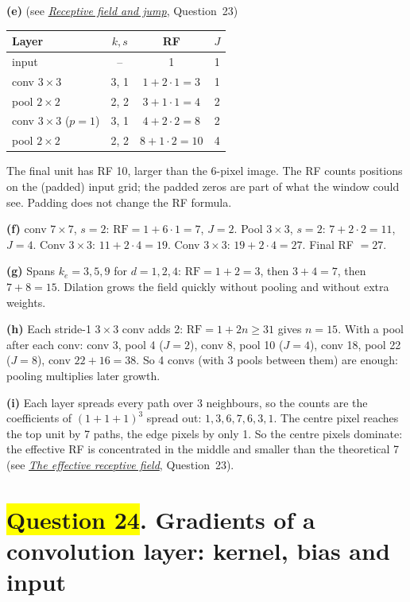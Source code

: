 \documentclass[12pt,a4paper]{article}
\newcommand{\seeconcept}[3]{(see \hyperref[#1]{\textit{#2}}, Question~#3)}
\newcommand{\hlq}[1]{{\setlength{\fboxsep}{1.5pt}\colorbox{yellow}{#1}}}
\begin{document}
\textbf{(e)} \seeconcept{c:rf}{Receptive field and jump}{23}
\begin{center}
\begin{tabular}{@{}lccc@{}}
\toprule
Layer & $k,s$ & RF & $J$\\
\midrule
input & -- & 1 & 1\\
conv $3\times3$ & 3, 1 & $1+2\cdot1=3$ & 1\\
pool $2\times2$ & 2, 2 & $3+1\cdot1=4$ & 2\\
conv $3\times3$ ($p=1$) & 3, 1 & $4+2\cdot2=8$ & 2\\
pool $2\times2$ & 2, 2 & $8+1\cdot2=10$ & 4\\
\bottomrule
\end{tabular}
\end{center}
The final unit has RF 10, larger than the 6-pixel image. The RF counts positions on the (padded) input grid; the padded zeros are part of what the window could see. Padding does not change the RF formula.

\textbf{(f)} conv $7\times7$, $s=2$: $\mathrm{RF}=1+6\cdot1=7$, $J=2$. Pool $3\times3$, $s=2$: $7+2\cdot2=11$, $J=4$. Conv $3\times3$: $11+2\cdot4=19$. Conv $3\times3$: $19+2\cdot4=27$. Final RF $=27$.

\textbf{(g)} Spans $k_e=3,5,9$ for $d=1,2,4$: $\mathrm{RF}=1+2=3$, then $3+4=7$, then $7+8=15$. Dilation grows the field quickly without pooling and without extra weights.

\textbf{(h)} Each stride-1 $3\times3$ conv adds 2: $\mathrm{RF}=1+2n\ge31$ gives $n=15$. With a pool after each conv: conv 3, pool 4 ($J=2$), conv 8, pool 10 ($J=4$), conv 18, pool 22 ($J=8$), conv $22+16=38$. So 4 convs (with 3 pools between them) are enough: pooling multiplies later growth.

\textbf{(i)} Each layer spreads every path over 3 neighbours, so the counts are the coefficients of $(1+1+1)^3$ spread out: $1,3,6,7,6,3,1$. The centre pixel reaches the top unit by 7 paths, the edge pixels by only 1. So the centre pixels dominate: the effective RF is concentrated in the middle and smaller than the theoretical 7 \seeconcept{c:effrf}{The effective receptive field}{23}.

\section[Question 24. Gradients of a convolution layer: kernel, bias and input]{\hlq{Question 24}. Gradients of a convolution layer: kernel, bias and input}
\end{document}
